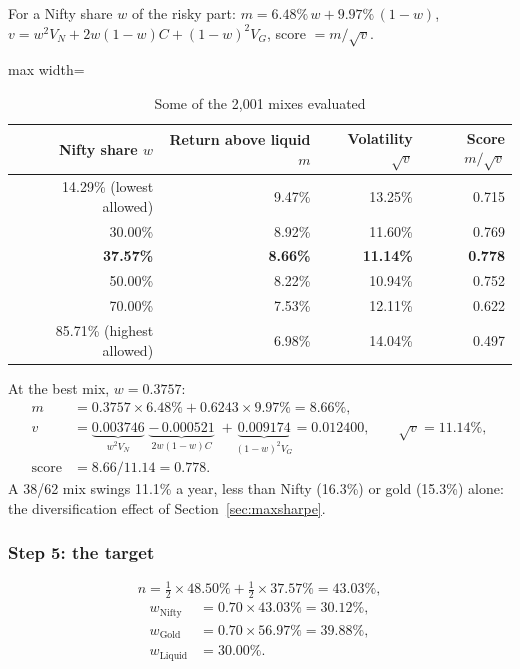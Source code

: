 For a Nifty share $w$ of the risky part:
$m = 6.48\%\,w + 9.97\%\,(1-w)$, \;
$v = w^2 V_N + 2w(1-w)C + (1-w)^2 V_G$, \;
score $= m/\sqrt{v}$.

\begin{table}[H]
\centering
\caption{Some of the 2{,}001 mixes evaluated}
\label{tab:ms-search}
\begin{adjustbox}{max width=\textwidth}
\begin{tabular}{@{}rrrr@{}}
\toprule
Nifty share $w$ & Return above liquid $m$ & Volatility $\sqrt{v}$ & Score $m/\sqrt{v}$ \\
\midrule
14.29\% (lowest allowed) & 9.47\% & 13.25\% & 0.715 \\
30.00\% & 8.92\% & 11.60\% & 0.769 \\
\textbf{37.57\%} & \textbf{8.66\%} & \textbf{11.14\%} & \textbf{0.778} \\
50.00\% & 8.22\% & 10.94\% & 0.752 \\
70.00\% & 7.53\% & 12.11\% & 0.622 \\
85.71\% (highest allowed) & 6.98\% & 14.04\% & 0.497 \\
\bottomrule
\end{tabular}
\end{adjustbox}
\end{table}

At the best mix, $w = 0.3757$:
\begin{align*}
  m &= 0.3757 \times 6.48\% + 0.6243 \times 9.97\% = 8.66\%,\\
  v &= \underbrace{0.003746}_{w^2V_N} \; \underbrace{-\,0.000521}_{2w(1-w)C} \; + \underbrace{0.009174}_{(1-w)^2V_G} = 0.012400,
      \qquad \sqrt{v} = 11.14\%,\\
  \text{score} &= 8.66 / 11.14 = 0.778 .
\end{align*}
A 38/62 mix swings 11.1\% a year, less than Nifty (16.3\%) or gold (15.3\%) alone: the
diversification effect of Section~\ref{sec:maxsharpe}.

\subsubsection{Step 5: the target}

\[
  n = \tfrac12 \times 48.50\% + \tfrac12 \times 37.57\% = 43.03\%,
\]
\begin{align*}
  w_{\text{Nifty}} &= 0.70 \times 43.03\% = 30.12\%, \\
  w_{\text{Gold}} &= 0.70 \times 56.97\% = 39.88\%, \\
  w_{\text{Liquid}} &= 30.00\% .
\end{align*}

